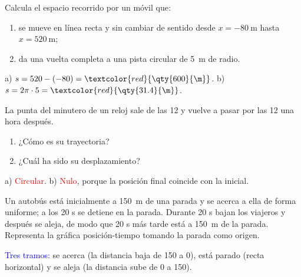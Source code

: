 \begin{exercise}
    Calcula el espacio recorrido por un móvil que:
    \begin{enumerate}[label=\alph*)]
        \item se mueve en línea recta y sin cambiar de sentido desde \(x = \qty{-80}{\m}\) hasta \(x = \qty{520}{\m}\);
        \item da una vuelta completa a una pista circular de \qty{5}{\m} de radio.
    \end{enumerate}
    \begin{solu}
        a) \(s = 520 - (-80) = \textcolor{red}{\qty{600}{\m}}\). b) \(s = 2\pi \cdot 5 = \textcolor{red}{\qty{31.4}{\m}}\).
    \end{solu}
\end{exercise}

\begin{exercise}
    La punta del minutero de un reloj sale de las 12 y vuelve a pasar por las 12 una hora después.
    \begin{enumerate}[label=\alph*)]
        \item ¿Cómo es su trayectoria?
        \item ¿Cuál ha sido su desplazamiento?
    \end{enumerate}
    \begin{solu}
        a) \textcolor{red}{Circular}. b) \textcolor{red}{Nulo}, porque la posición final coincide con la inicial.
    \end{solu}
\end{exercise}

\begin{exercise}
    Un autobús está inicialmente a \qty{150}{\m} de una parada y se acerca a ella de forma uniforme; a los 20 s se detiene en la parada. Durante 20 s bajan los viajeros y después se aleja, de modo que 20 s más tarde está a \qty{150}{\m} de la parada. Representa la gráfica posición-tiempo tomando la parada como origen.
    \begin{solu}
        \begin{center}
        \end{center}
        \textcolor{blue}{Tres tramos:} se acerca (la distancia baja de 150 a 0), está parado (recta horizontal) y se aleja (la distancia sube de 0 a 150).
    \end{solu}
\end{exercise}

